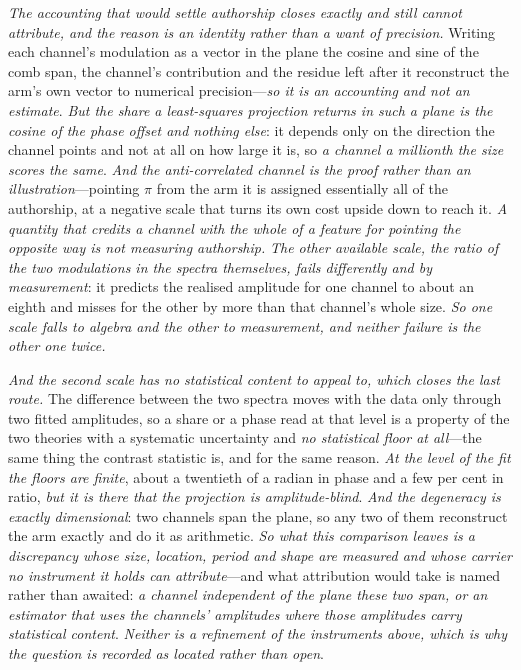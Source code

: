 \documentclass[11pt,a4paper]{article}
\theoremstyle{plain}
\theoremstyle{definition}
\theoremstyle{remark}
\begin{document}
\emph{The accounting that would settle authorship closes exactly and still cannot attribute, and the reason is
an identity rather than a want of precision.} Writing each channel's modulation as a vector in the plane the
cosine and sine of the comb span, the channel's contribution and the residue left after it reconstruct the arm's
own vector to numerical precision---\emph{so it is an accounting and not an estimate}. \emph{But the share a
least-squares projection returns in such a plane is the cosine of the phase offset and nothing else}: it depends
only on the direction the channel points and not at all on how large it is, so \emph{a channel a millionth the
size scores the same}. \emph{And the anti-correlated channel is the proof rather than an illustration}---pointing
$\pi$ from the arm it is assigned essentially all of the authorship, at a negative scale that turns its own cost
upside down to reach it. \emph{A quantity that credits a channel with the whole of a feature for pointing the
opposite way is not measuring authorship.} \emph{The other available scale, the ratio of the two modulations in
the spectra themselves, fails differently and by measurement}: it predicts the realised amplitude for one channel
to about an eighth and misses for the other by more than that channel's whole size. \emph{So one scale falls to
algebra and the other to measurement, and neither failure is the other one twice.}

\emph{And the second scale has no statistical content to appeal to, which closes the last route.} The difference
between the two spectra moves with the data only through two fitted amplitudes, so a share or a phase read at
that level is a property of the two theories with a systematic uncertainty and \emph{no statistical floor at
all}---the same thing the contrast statistic is, and for the same reason. \emph{At the level of the fit the floors
are finite}, about a twentieth of a radian in phase and a few per cent in ratio, \emph{but it is there that the
projection is amplitude-blind}. \emph{And the degeneracy is exactly dimensional}: two channels span the plane, so
any two of them reconstruct the arm exactly and do it as arithmetic. \emph{So what this comparison leaves is a
discrepancy whose size, location, period and shape are measured and whose carrier no instrument it holds can
attribute}---and what attribution would take is named rather than awaited: \emph{a channel independent of the
plane these two span, or an estimator that uses the channels' amplitudes where those amplitudes carry statistical
content}. \emph{Neither is a refinement of the instruments above, which is why the question is recorded as
located rather than
open}.
\end{document}
